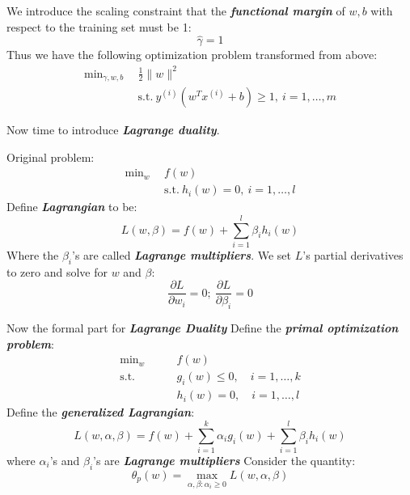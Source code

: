 \documentclass{article}
\begin{document}
We introduce the scaling constraint that the \emph{\textbf{functional margin}} of $w,b$ with respect to the training set must be 1:
\begin{equation*}
\hat{\gamma}=1
\end{equation*}
Thus we have the following optimization problem transformed from above:
\begin{align*}
\min\nolimits_{\gamma,w,b}\ &\ \frac{1}{2}\lVert w\rVert^2 \\
                  &\ \text{s.t.}\  y^{(i)}(w^Tx^{(i)}+b)\geq1,\ i=1,\ldots,m
\end{align*}

Now time to introduce \emph{\textbf{Lagrange duality}}.

Original problem:
\begin{align*}
\min\nolimits_w\ &\ f(w) \\
                 &\ \text{s.t.}\ h_i(w)=0,\ i=1,\ldots,l
\end{align*}
Define \emph{\textbf{Lagrangian}} to be:
\begin{equation*}
L(w,\beta)=f(w)+\sum_{i=1}^l\beta_ih_i(w)
\end{equation*}
Where the $\beta_i$'s are called \emph{\textbf{Lagrange multipliers}}.
We set $L$'s partial derivatives to zero and solve for $w$ and $\beta$:
\begin{equation*}
\frac{\partial L}{\partial w_i}=0;\ \frac{\partial L}{\partial \beta_i}=0
\end{equation*}

Now the formal part for \emph{\textbf{Lagrange Duality}}
Define the \emph{\textbf{primal optimization problem}}:
\begin{align*}
\min\nolimits_w\quad\quad &f(w) \\
\text{s.t.}\quad &g_i(w)\leq0,\quad i=1,\ldots,k \\
                 &h_i(w)=0,\quad i=1,\ldots,l
\end{align*}
Define the \emph{\textbf{generalized Lagrangian}}:
\begin{equation*}
L(w,\alpha,\beta)=f(w)+\sum_{i=1}^{k}\alpha_ig_i(w)+\sum_{i=1}^l\beta_ih_i(w)
\end{equation*}
where $\alpha_i$'s and $\beta_i$'s are \emph{\textbf{Lagrange multipliers}}
Consider the quantity:
\begin{equation*}
\theta_p(w)=\max_{\alpha,\beta:\alpha_i\geq0}L(w,\alpha,\beta)
\end{equation*}
\end{document}
